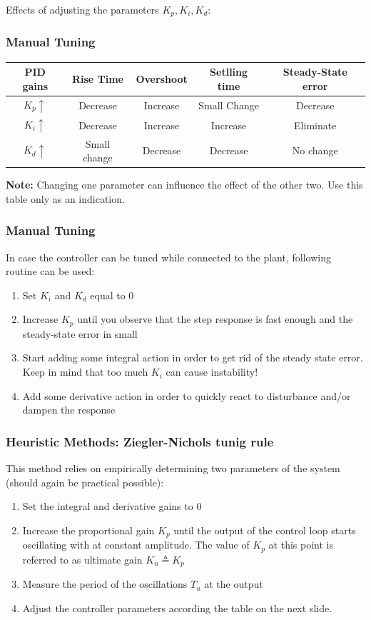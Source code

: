\begin{frame}
	Effects of adjusting the parameters $K_p, K_i, K_d$:
	\vspace{1em}
	\frametitle{Manual Tuning}
	{
	\small
	\begin{tabular}{c | c | c | c | c }
		PID gains	&	Rise Time 	&	Overshoot	&	Setlling time	&	Steady-State error \\
		\hline
		$K_p \uparrow$ & Decrease	&	Increase	&	Small Change	&	Decrease \\
		$K_i \uparrow$ & Decrease	&	Increase	&	Increase		&	Eliminate \\
		$K_d \uparrow$ & Small change &	Decrease	&	Decrease		&	No change \\
	\end{tabular}
	}
	\vspace{1em}
	
	\textbf{Note:} Changing one parameter can influence the effect of the other two. Use this table only as an indication.
\end{frame}

\begin{frame}
	\frametitle{Manual Tuning}
	In case the controller can be tuned while connected to the plant, following routine can be used:
	\begin{enumerate}
		\item Set $K_i$ and $K_d$ equal to 0
		\item Increase $K_p$ until you observe that the step response is fast enough and the steady-state error in small
		\item Start adding some integral action in order to get rid of the steady state error. Keep in mind that too much $K_i$ can cause instability!
		\item Add some derivative action in order to quickly react to disturbance and/or dampen the response
		
	\end{enumerate}
\end{frame}


\begin{frame}
	\frametitle{Heuristic Methods: Ziegler-Nichols tunig rule}
		This method relies on empirically determining two parameters of the system (should again be practical possible):
		\begin{enumerate}
			\item Set the integral and derivative gains to 0
			\item Increase the proportional gain $K_p$ until the output of the control loop starts oscillating with at constant amplitude. The value of $K_p$ at this point is referred to as ultimate gain $K_u \triangleq K_p$
			\item Measure the period of the oscillations $T_u$ at the output
			\item Adjust the controller parameters according the table on the next slide.
		\end{enumerate}
\end{frame}

